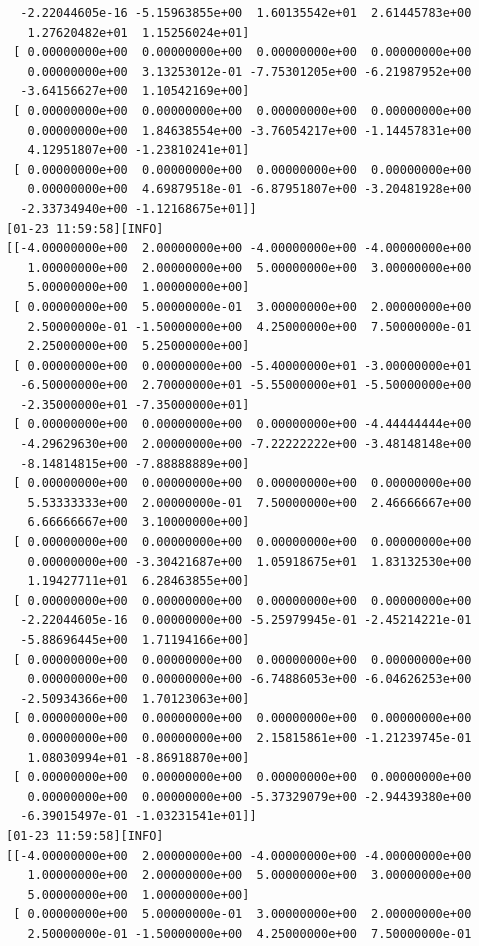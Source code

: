 \documentclass[
  letterpaper,
  DIV=11,
  numbers=noendperiod]{scrartcl}
\begin{document}
\begin{verbatim}
  -2.22044605e-16 -5.15963855e+00  1.60135542e+01  2.61445783e+00
   1.27620482e+01  1.15256024e+01]
 [ 0.00000000e+00  0.00000000e+00  0.00000000e+00  0.00000000e+00
   0.00000000e+00  3.13253012e-01 -7.75301205e+00 -6.21987952e+00
  -3.64156627e+00  1.10542169e+00]
 [ 0.00000000e+00  0.00000000e+00  0.00000000e+00  0.00000000e+00
   0.00000000e+00  1.84638554e+00 -3.76054217e+00 -1.14457831e+00
   4.12951807e+00 -1.23810241e+01]
 [ 0.00000000e+00  0.00000000e+00  0.00000000e+00  0.00000000e+00
   0.00000000e+00  4.69879518e-01 -6.87951807e+00 -3.20481928e+00
  -2.33734940e+00 -1.12168675e+01]]
[01-23 11:59:58][INFO] 
[[-4.00000000e+00  2.00000000e+00 -4.00000000e+00 -4.00000000e+00
   1.00000000e+00  2.00000000e+00  5.00000000e+00  3.00000000e+00
   5.00000000e+00  1.00000000e+00]
 [ 0.00000000e+00  5.00000000e-01  3.00000000e+00  2.00000000e+00
   2.50000000e-01 -1.50000000e+00  4.25000000e+00  7.50000000e-01
   2.25000000e+00  5.25000000e+00]
 [ 0.00000000e+00  0.00000000e+00 -5.40000000e+01 -3.00000000e+01
  -6.50000000e+00  2.70000000e+01 -5.55000000e+01 -5.50000000e+00
  -2.35000000e+01 -7.35000000e+01]
 [ 0.00000000e+00  0.00000000e+00  0.00000000e+00 -4.44444444e+00
  -4.29629630e+00  2.00000000e+00 -7.22222222e+00 -3.48148148e+00
  -8.14814815e+00 -7.88888889e+00]
 [ 0.00000000e+00  0.00000000e+00  0.00000000e+00  0.00000000e+00
   5.53333333e+00  2.00000000e-01  7.50000000e+00  2.46666667e+00
   6.66666667e+00  3.10000000e+00]
 [ 0.00000000e+00  0.00000000e+00  0.00000000e+00  0.00000000e+00
   0.00000000e+00 -3.30421687e+00  1.05918675e+01  1.83132530e+00
   1.19427711e+01  6.28463855e+00]
 [ 0.00000000e+00  0.00000000e+00  0.00000000e+00  0.00000000e+00
  -2.22044605e-16  0.00000000e+00 -5.25979945e-01 -2.45214221e-01
  -5.88696445e+00  1.71194166e+00]
 [ 0.00000000e+00  0.00000000e+00  0.00000000e+00  0.00000000e+00
   0.00000000e+00  0.00000000e+00 -6.74886053e+00 -6.04626253e+00
  -2.50934366e+00  1.70123063e+00]
 [ 0.00000000e+00  0.00000000e+00  0.00000000e+00  0.00000000e+00
   0.00000000e+00  0.00000000e+00  2.15815861e+00 -1.21239745e-01
   1.08030994e+01 -8.86918870e+00]
 [ 0.00000000e+00  0.00000000e+00  0.00000000e+00  0.00000000e+00
   0.00000000e+00  0.00000000e+00 -5.37329079e+00 -2.94439380e+00
  -6.39015497e-01 -1.03231541e+01]]
[01-23 11:59:58][INFO] 
[[-4.00000000e+00  2.00000000e+00 -4.00000000e+00 -4.00000000e+00
   1.00000000e+00  2.00000000e+00  5.00000000e+00  3.00000000e+00
   5.00000000e+00  1.00000000e+00]
 [ 0.00000000e+00  5.00000000e-01  3.00000000e+00  2.00000000e+00
   2.50000000e-01 -1.50000000e+00  4.25000000e+00  7.50000000e-01

\end{verbatim}
\end{document}
